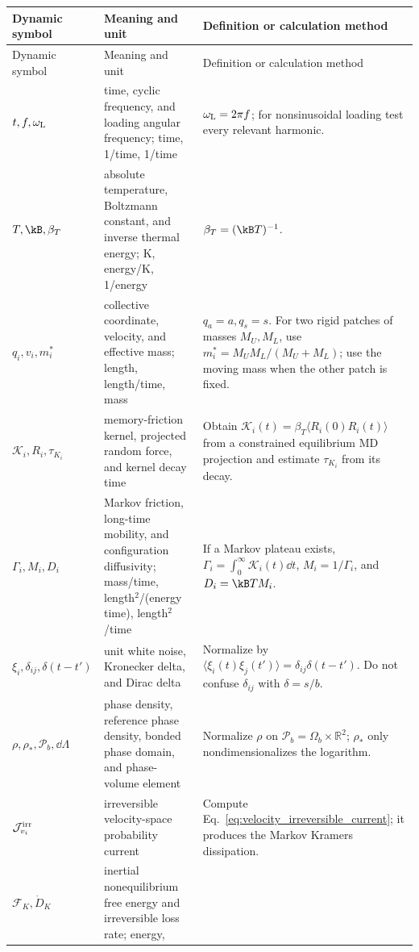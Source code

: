 \begin{longtable}{>{\raggedright\arraybackslash}p{}
                  >{\raggedright\arraybackslash}p{}
                  >{\raggedright\arraybackslash}p{}}
\toprule
Dynamic symbol & Meaning and unit & Definition or calculation method\\
\midrule
\endfirsthead
\toprule
Dynamic symbol & Meaning and unit & Definition or calculation method\\
\midrule
\endhead
\bottomrule
\endfoot
$t,f,\omega_{\rm L}$ & time, cyclic frequency, and loading angular frequency; time, 1/time, 1/time &
$\omega_{\rm L}=2\pi f$; for nonsinusoidal loading test every relevant harmonic.\\
$T,\kB,\beta_T$ & absolute temperature, Boltzmann constant, and inverse thermal energy; K,
energy/K, 1/energy & $\beta_T=(\kB T)^{-1}$.\\
$q_i,v_i,m_i^*$ & collective coordinate, velocity, and effective mass; length, length/time, mass &
$q_a=a,q_s=s$. For two rigid patches of masses $M_U,M_L$, use
$m_i^*=M_UM_L/(M_U+M_L)$; use the moving mass when the other patch is fixed.\\
$\mathcal K_i,R_i,\tau_{K_i}$ & memory-friction kernel, projected random force, and kernel decay
time & Obtain $\mathcal K_i(t)=\beta_T\langle R_i(0)R_i(t)\rangle$ from a constrained equilibrium
MD projection and estimate $\tau_{K_i}$ from its decay.\\
$\Gamma_i,M_i,D_i$ & Markov friction, long-time mobility, and configuration diffusivity;
mass/time, length$^2$/(energy time), length$^2$/time & If a Markov plateau exists,
$\Gamma_i=\int_0^\infty\mathcal K_i(t)\dd t$, $M_i=1/\Gamma_i$, and $D_i=\kB TM_i$.\\
$\xi_i,\delta_{ij},\delta(t-t')$ & unit white noise, Kronecker delta, and Dirac delta & Normalize by
$\langle\xi_i(t)\xi_j(t')\rangle=\delta_{ij}\delta(t-t')$. Do not confuse $\delta_{ij}$ with
$\delta=s/b$.\\
$\rho,\rho_*,\mathcal P_b,\dd\Lambda$ & phase density, reference phase density, bonded phase domain,
and phase-volume element & Normalize $\rho$ on $\mathcal P_b=\Omega_b\times\mathbb R^2$;
$\rho_*$ only nondimensionalizes the logarithm.\\
$\mathcal J_{v_i}^{\rm irr}$ & irreversible velocity-space probability current & Compute
Eq.~\eqref{eq:velocity_irreversible_current}; it produces the Markov Kramers dissipation.\\
$\mathcal F_K,\dot D_K$ & inertial nonequilibrium free energy and irreversible loss rate; energy,

\end{longtable}
